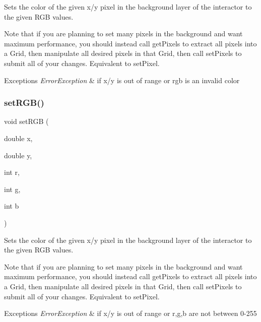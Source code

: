 Sets the color of the given x/y pixel in the background layer of the interactor to the given R\+GB values. 

Note that if you are planning to set many pixels in the background and want maximum performance, you should instead call get\+Pixels to extract all pixels into a Grid, then manipulate all desired pixels in that Grid, then call set\+Pixels to submit all of your changes. Equivalent to set\+Pixel.


\begin{DoxyExceptions}{Exceptions}
{\em Error\+Exception} & if x/y is out of range or rgb is an invalid color \\
\hline
\end{DoxyExceptions}
\mbox{\label{classGDrawingSurface_a81202471d4fc9f2015aef0bc073acfab}} 
\subsubsection{\texorpdfstring{set\+R\+G\+B()}{setRGB()}\hspace{0.1cm}{\footnotesize\ttfamily [2/3]}}
{\footnotesize\ttfamily void set\+R\+GB (\begin{DoxyParamCaption}\item[{double}]{x,  }\item[{double}]{y,  }\item[{int}]{r,  }\item[{int}]{g,  }\item[{int}]{b }\end{DoxyParamCaption})\hspace{0.3cm}{\ttfamily [virtual]}}



Sets the color of the given x/y pixel in the background layer of the interactor to the given R\+GB values. 

Note that if you are planning to set many pixels in the background and want maximum performance, you should instead call get\+Pixels to extract all pixels into a Grid, then manipulate all desired pixels in that Grid, then call set\+Pixels to submit all of your changes. Equivalent to set\+Pixel.


\begin{DoxyExceptions}{Exceptions}
{\em Error\+Exception} & if x/y is out of range or r,g,b are not between 0-\/255 \\
\hline
\end{DoxyExceptions}
\mbox{\label{classGDrawingSurface_ae9a228792d4bb4b628350f39eaa3ad12}} 
